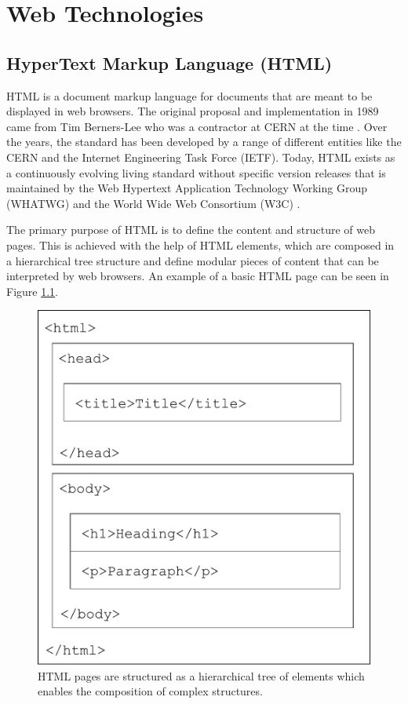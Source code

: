\chapter{Web Technologies}
\label{chap:WebTechnologies}

\section{HyperText Markup Language (HTML)}
\label{sec:HTML}

HTML is a document markup language for documents that are meant to be displayed in web browsers.
The original proposal and implementation in 1989 came from Tim Berners-Lee who was a contractor at CERN at the time \parencite{TBLProposal}.
Over the years, the standard has been developed by a range of different entities like the CERN and the Internet Engineering Task Force (IETF). 
Today, HTML exists as a continuously evolving living standard without specific version releases that is maintained by the Web Hypertext Application Technology Working Group (WHATWG) and the World Wide Web Consortium (W3C) \parencite{HTMLSpec}.

The primary purpose of HTML is to define the content and structure of
web pages. This is achieved with the help of HTML elements, which are
composed in a hierarchical tree structure and define modular pieces of
content that can be interpreted by web browsers. An example of a basic
HTML page can be seen in Figure \ref{fig:HTMLStructure}.

\begin{figure}[tp]
\centering
\includegraphics[keepaspectratio,width=\linewidth,height=\halfh]
{diagrams/html-structure.pdf}

\caption[Structure of HTML pages]{
HTML pages are structured as a hierarchical tree of elements
which enables the composition of complex structures.
}
\label{fig:HTMLStructure}
\end{figure}

